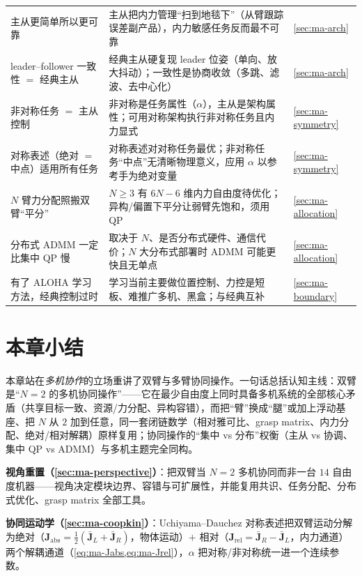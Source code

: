 \begin{table}[H]
\begin{tabular}{p{5.6cm}p{7.0cm}p{1.4cm}}
主从更简单所以更可靠 & 主从把内力管理“扫到地毯下”（从臂跟踪误差副产品），内力敏感任务反而最不可靠 & \cref{sec:ma-arch} \\
leader--follower 一致性 $=$ 经典主从 & 经典主从硬复现 leader 位姿（单向、放大抖动）；一致性是协商收敛（多跳、滤波、去中心化） & \cref{sec:ma-arch} \\
非对称任务 $=$ 主从控制 & 非对称是任务属性（$\alpha$），主从是架构属性；可用对称架构执行非对称任务且内力显式 & \cref{sec:ma-symmetry} \\
对称表述（绝对 $=$ 中点）适用所有任务 & 对称表述对对称任务最优；非对称任务“中点”无清晰物理意义，应用 $\alpha$ 以参考手为绝对变量 & \cref{sec:ma-symmetry} \\
$N$ 臂力分配照搬双臂“平分” & $N\ge3$ 有 $6N-6$ 维内力自由度待优化；异构/偏置下平分让弱臂先饱和，须用 QP & \cref{sec:ma-allocation} \\
分布式 ADMM 一定比集中 QP 慢 & 取决于 $N$、是否分布式硬件、通信代价；$N$ 大分布式部署时 ADMM 可能更快且无单点 & \cref{sec:ma-allocation} \\
有了 ALOHA 学习方法，经典控制过时 & 学习当前主要做位置控制、力控是短板、难推广多机、黑盒；与经典互补 & \cref{sec:ma-boundary} \\
\bottomrule
\end{tabular}
\end{table}

\section*{本章小结}

本章站在\emph{多机协作}的立场重讲了双臂与多臂协同操作。一句话总括认知主线：双臂是“$N=2$ 的多机协同操作”——它在最少自由度上同时具备多机系统的全部核心矛盾（共享目标一致、资源/力分配、异构容错），而把“臂”换成“腿”或加上浮动基座、把 $N$ 从 $2$ 加到任意，同一套闭链数学（相对雅可比、grasp matrix、内力分配、绝对/相对解耦）原样复用；协同操作的“集中 vs 分布”权衡（主从 vs 协调、集中 QP vs ADMM）与多机主题完全同构。

\textbf{视角重置（\cref{sec:ma-perspective}）}：把双臂当 $N=2$ 多机协同而非一台 $14$ 自由度机器——视角决定模块边界、容错与可扩展性，并能复用共识、任务分配、分布式优化、grasp matrix 全部工具。

\textbf{协同运动学（\cref{sec:ma-coopkin}）}：Uchiyama--Dauchez 对称表述把双臂运动分解为绝对（$\mathbf{J}_{\text{abs}}=\tfrac12(\bar{\mathbf{J}}_L+\bar{\mathbf{J}}_R)$，物体运动）$+$ 相对（$\mathbf{J}_{\text{rel}}=\bar{\mathbf{J}}_R-\bar{\mathbf{J}}_L$，内力通道）两个解耦通道（\cref{eq:ma-Jabs,eq:ma-Jrel}），$\alpha$ 把对称/非对称统一进一个连续参数。

